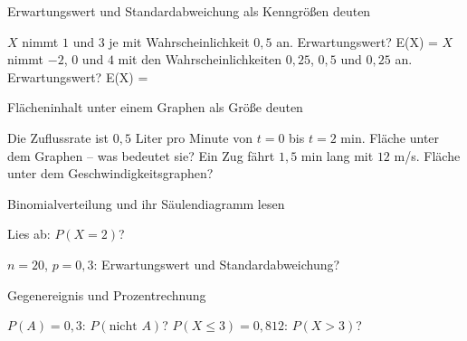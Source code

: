 \setcounter{aufgabe}{0}

\begin{aufgabe}{Erwartungswert und Standardabweichung als Kenngrößen deuten}
\begin{teile}
\teil $X$ nimmt $1$ und $3$ je mit Wahrscheinlichkeit $0{,}5$ an. Erwartungswert? E(X) = \leerfeld
\teil $X$ nimmt $-2$, $0$ und $4$ mit den Wahrscheinlichkeiten $0{,}25$, $0{,}5$ und $0{,}25$ an. Erwartungswert? E(X) = \leerfeld
\end{teile}
\end{aufgabe}

\begin{aufgabe}{Flächeninhalt unter einem Graphen als Größe deuten}
\begin{teile}
\teil Die Zuflussrate ist $0{,}5$ Liter pro Minute von $t = 0$ bis $t = 2$ min. Fläche unter dem Graphen – was bedeutet sie? \leerfeld[l]
\teil Ein Zug fährt $1{,}5$ min lang mit $12$ m/s. Fläche unter dem Geschwindigkeitsgraphen? \leerfeld[m]
\end{teile}
\end{aufgabe}

\begin{aufgabe}{Binomialverteilung und ihr Säulendiagramm lesen}
\begin{teile}
\teil Lies ab: $P(X = 2)$?

\leerfeld
\teil $n = 20$, $p = 0{,}3$: Erwartungswert und Standardabweichung?
\end{teile}
\end{aufgabe}

\begin{aufgabe}{Gegenereignis und Prozentrechnung}
\begin{teile}
\teil $P(A) = 0{,}3$: $P(\text{nicht } A)$? \leerfeld
\teil $P(X \le 3) = 0{,}812$: $P(X > 3)$? \leerfeld
\end{teile}
\end{aufgabe}

